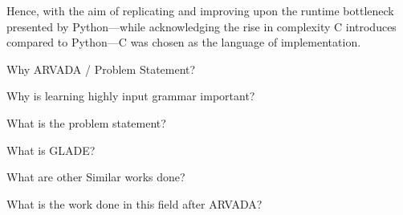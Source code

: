 \vspace{\baselineskip}
Hence, with the aim of replicating and improving upon the runtime bottleneck presented by Python—while acknowledging the rise in complexity C introduces compared to Python—C was chosen as the language of implementation.

Why ARVADA / Problem Statement?

Why is learning highly input grammar important?

What is the problem statement?

What is GLADE?

What are other Similar works done?

What is the work done in this field after ARVADA?



